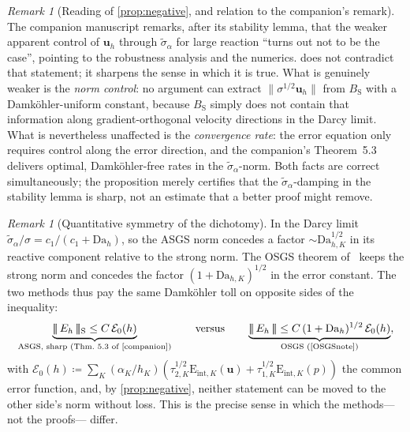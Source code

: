 \documentclass[11pt]{article}
\theoremstyle{remark}
\newtheorem{remark}[theorem]{Remark}
\newcommand{\bu}{\boldsymbol{u}}
\newcommand{\norm}[1]{\lVert #1 \rVert}
\newcommand{\tnorm}[1]{\lvert\!\lvert\!\lvert\, #1 \,\rvert\!\rvert\!\rvert}
\newcommand{\Eint}[2]{\mathrm{E}_{\mathrm{int},#1}(#2)}
\newcommand{\Dah}{\mathrm{Da}_{h,K}}
\newcommand{\st}{\widetilde{\sigma}_\alpha}
\newcommand{\Bs}{B_{\mathrm{S}}}
\newcommand{\EF}{\mathcal{E}}
\begin{document}
\begin{remark}[Reading of \cref{prop:negative}, and relation to the companion's
remark]
\label{rem:reading}
The companion manuscript remarks, after its stability lemma, that the weaker
apparent control of $\bu_h$ through $\st$ for large reaction ``turns out not to be
the case'', pointing to the robustness analysis and the numerics.
 does not contradict that statement; it sharpens the sense in
which it is true. What is genuinely weaker is the \emph{norm control}: no argument
can extract $\norm{\sigma^{1/2}\bu_h}$ from $\Bs$ with a Damk\"ohler-uniform
constant, because $\Bs$ simply does not contain that information along
gradient-orthogonal velocity directions in the Darcy limit. What is nevertheless
unaffected is the \emph{convergence rate}: the error equation only requires control
along the error direction, and the companion's Theorem~5.3 delivers optimal,
Damk\"ohler-free rates in the $\st$-norm. Both facts are correct simultaneously; the
proposition merely certifies that the $\st$-damping in the stability lemma is sharp,
not an estimate that a better proof might remove.
\end{remark}

\begin{remark}[Quantitative symmetry of the dichotomy]
\label{rem:symmetry}
In the Darcy limit $\st/\sigma = c_1/(c_1+\mathrm{Da}_h)$, so the ASGS norm concedes
a factor $\sim\Dah^{1/2}$ in its reactive component relative to the strong norm.
The OSGS theorem of~\cite{OSGSnote} keeps the strong norm and concedes the factor
$(1+\Dah)^{1/2}$ in the error constant. The two methods thus pay the same
Damk\"ohler toll on opposite sides of the inequality:
\[
  \underbrace{\tnorm{E_h}_{\mathrm{S}} \le C\,\EF_0(h)}_{\text{ASGS, sharp
  (Thm.~5.3 of~\cite{companion})}}
  \qquad\text{versus}\qquad
  \underbrace{\tnorm{E_h} \le C\,(1+\mathrm{Da}_h)^{1/2}\,\EF_0(h)}_{\text{OSGS
  (\cite{OSGSnote})}},
\]
with $\EF_0(h) \coloneqq \sum_K (\alpha_K/h_K)(\tau_{2,K}^{1/2}\Eint{K}{\bu} +
\tau_{1,K}^{1/2}\Eint{K}{p})$ the common error function, and, by
\cref{prop:negative}, neither statement can be moved to the other side's norm
without loss. This is the precise sense in which the methods---not the proofs---
differ.
\end{remark}
\end{document}

